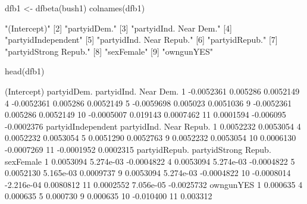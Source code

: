 \begin{Schunk}
\begin{Sinput}
 dfb1 <- dfbeta(bush1)
 colnames(dfb1)
\end{Sinput}
\begin{Soutput}
[1] "(Intercept)"            
[2] "partyidDem."            
[3] "partyidInd. Near Dem."  
[4] "partyidIndependent"     
[5] "partyidInd. Near Repub."
[6] "partyidRepub."          
[7] "partyidStrong Repub."   
[8] "sexFemale"              
[9] "owngunYES"              
\end{Soutput}
\begin{Sinput}
 head(dfb1)
\end{Sinput}
\begin{Soutput}
   (Intercept) partyidDem. partyidInd. Near Dem.
1   -0.0052361    0.005286             0.0052149
4   -0.0052361    0.005286             0.0052149
5   -0.0059698    0.005023             0.0051036
9   -0.0052361    0.005286             0.0052149
10  -0.0005007    0.019143             0.0007462
11   0.0001594   -0.006095            -0.0002376
   partyidIndependent partyidInd. Near Repub.
1           0.0052232               0.0053054
4           0.0052232               0.0053054
5           0.0051290               0.0052763
9           0.0052232               0.0053054
10          0.0006130              -0.0007269
11         -0.0001952               0.0002315
   partyidRepub. partyidStrong Repub.  sexFemale
1      0.0053094            5.274e-03 -0.0004822
4      0.0053094            5.274e-03 -0.0004822
5      0.0052130            5.165e-03  0.0009737
9      0.0053094            5.274e-03 -0.0004822
10    -0.0008014           -2.216e-04  0.0080812
11     0.0002552            7.056e-05 -0.0025732
   owngunYES
1   0.000635
4   0.000635
5   0.000730
9   0.000635
10 -0.010400
11  0.003312
\end{Soutput}
\end{Schunk}
